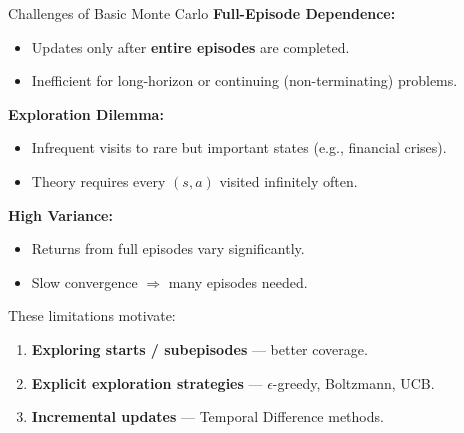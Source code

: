 \documentclass[10pt,english,aspectratio=169]{beamer}
\begin{document}
\begin{frame}{Challenges of Basic Monte Carlo}
\textbf{Full-Episode Dependence:}
\begin{itemize}
    \item Updates only after \textbf{entire episodes} are completed.
    \item Inefficient for long-horizon or continuing (non-terminating) problems.
\end{itemize}

\vspace{0.2cm}
\textbf{Exploration Dilemma:}
\begin{itemize}
    \item Infrequent visits to rare but important states (e.g., financial crises).
    \item Theory requires every $(s,a)$ visited infinitely often.
\end{itemize}

\vspace{0.2cm}
\textbf{High Variance:}
\begin{itemize}
    \item Returns from full episodes vary significantly.
    \item Slow convergence $\Rightarrow$ many episodes needed.
\end{itemize}

\vspace{0.3cm}
These limitations motivate:
\begin{enumerate}
    \item \textbf{Exploring starts / subepisodes} --- better coverage.
    \item \textbf{Explicit exploration strategies} --- $\epsilon$-greedy, Boltzmann, UCB.
    \item \textbf{Incremental updates} --- Temporal Difference methods.
\end{enumerate}
\end{frame}
\end{document}
